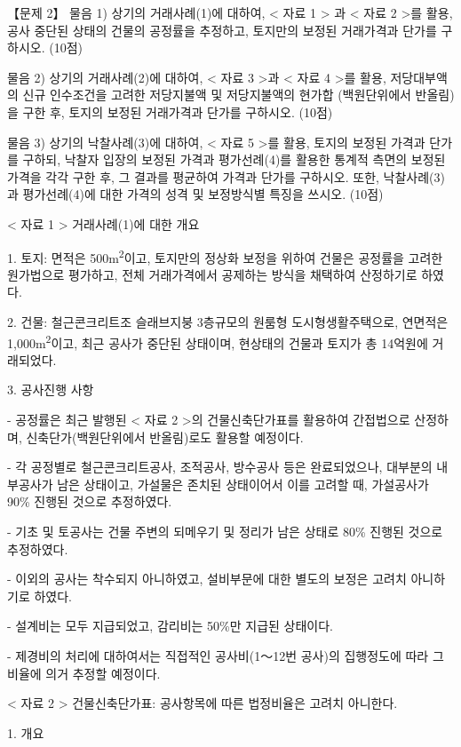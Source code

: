 \begin{longquestion}{【문제 2】}
\medskip\noindent 물음 1) 상기의 거래사례(1)에 대하여, < 자료 1 > 과 < 자료 2 >를 활용, 공사 중단된 상태의 건물의 공정률을 추정하고, 토지만의 보정된 거래가격과 단가를 구하시오. (10점) \par
\medskip\noindent 물음 2) 상기의 거래사례(2)에 대하여, < 자료 3 >과 < 자료 4 >를 활용, 저당대부액의 신규 인수조건을 고려한 저당지불액 및 저당지불액의 현가합 (백원단위에서 반올림)을 구한 후, 토지의 보정된 거래가격과 단가를 구하시오. (10점) \par
\medskip\noindent 물음 3) 상기의 낙찰사례(3)에 대하여, < 자료 5 >를 활용, 토지의 보정된 가격과 단가를 구하되, 낙찰자 입장의 보정된 가격과 평가선례(4)를 활용한 통계적 측면의 보정된 가격을 각각 구한 후, 그 결과를 평균하여 가격과 단가를 구하시오. 또한, 낙찰사례(3)과 평가선례(4)에 대한 가격의 성격 및 보정방식별 특징을 쓰시오. (10점) \par
< 자료 1 > 거래사례(1)에 대한 개요 \par
1. 토지: 면적은 500m\textsuperscript{2}이고, 토지만의 정상화 보정을 위하여 건물은 공정률을 고려한 원가법으로 평가하고, 전체 거래가격에서 공제하는 방식을 채택하여 산정하기로 하였다. \par
2. 건물: 철근콘크리트조 슬래브지붕 3층규모의 원룸형 도시형생활주택으로, 연면적은 1,000m\textsuperscript{2}이고, 최근 공사가 중단된 상태이며, 현상태의 건물과 토지가 총 14억원에 거래되었다. \par
3. 공사진행 사항 \par
- 공정률은 최근 발행된 < 자료 2 >의 건물신축단가표를 활용하여 간접법으로 산정하며, 신축단가(백원단위에서 반올림)로도 활용할 예정이다. \par
- 각 공정별로 철근콘크리트공사, 조적공사, 방수공사 등은 완료되었으나, 대부분의 내부공사가 남은 상태이고, 가설물은 존치된 상태이어서 이를 고려할 때, 가설공사가 90\% 진행된 것으로 추정하였다. \par
- 기초 및 토공사는 건물 주변의 되메우기 및 정리가 남은 상태로 80\% 진행된 것으로 추정하였다. \par
- 이외의 공사는 착수되지 아니하였고, 설비부문에 대한 별도의 보정은 고려치 아니하기로 하였다. \par
- 설계비는 모두 지급되었고, 감리비는 50\%만 지급된 상태이다. \par
- 제경비의 처리에 대하여서는 직접적인 공사비(1～12번 공사)의 집행정도에 따라 그 비율에 의거 추정할 예정이다. \par
< 자료 2 > 건물신축단가표: 공사항목에 따른 법정비율은 고려치 아니한다. \par
1. 개요 \par
{\small\centering\renewcommand{\arraystretch}{1.25}
\par}


\end{longquestion}
